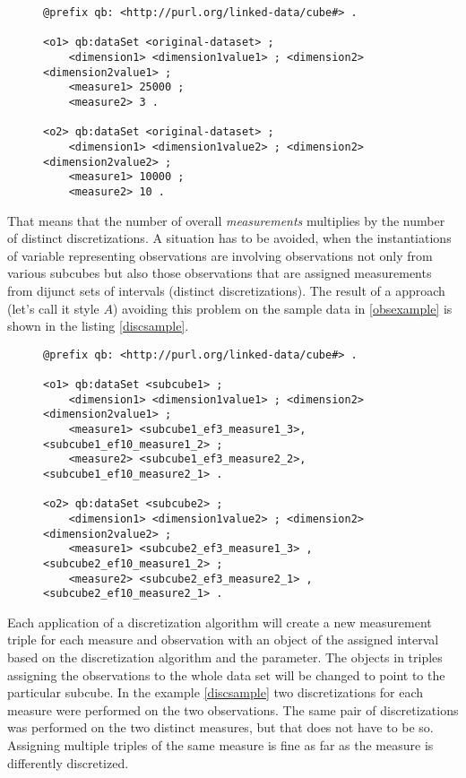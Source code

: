\begin{figure}[h]
\begin{lstlisting}[language = turtle, caption={Observations example}, label={obsexample},captionpos=b escapeinside={(*@}{@*)}]
@prefix qb: <http://purl.org/linked-data/cube#> .

<o1> qb:dataSet <original-dataset> ;
    <dimension1> <dimension1value1> ; <dimension2> <dimension2value1> ;
    <measure1> 25000 ;
    <measure2> 3 .
    
<o2> qb:dataSet <original-dataset> ;
    <dimension1> <dimension1value2> ; <dimension2> <dimension2value2> ;
    <measure1> 10000 ;
    <measure2> 10 .
\end{lstlisting}
\end{figure}

That means that the number of overall \textit{measurements} multiplies by the number of distinct discretizations. A situation has to be avoided, when the instantiations of variable representing observations are involving observations not only from various subcubes but also those observations that are assigned measurements from dijunct sets of intervals (distinct discretizations). The result of a approach (let's call it style $A$) avoiding this problem on the sample data in \ref{obsexample} is shown in the listing \ref{discsample}.

\begin{figure}[h]
\begin{lstlisting}[language = turtle, caption={Structure style A}, label={discsample},captionpos=b escapeinside={(*@}{@*)}]
@prefix qb: <http://purl.org/linked-data/cube#> .
            
<o1> qb:dataSet <subcube1> ;
    <dimension1> <dimension1value1> ; <dimension2> <dimension2value1> ;
    <measure1> <subcube1_ef3_measure1_3>, <subcube1_ef10_measure1_2> ;
    <measure2> <subcube1_ef3_measure2_2>, <subcube1_ef10_measure2_1> .
   
<o2> qb:dataSet <subcube2> ;
    <dimension1> <dimension1value2> ; <dimension2> <dimension2value2> ;
    <measure1> <subcube2_ef3_measure1_3> , <subcube2_ef10_measure1_2> ;
    <measure2> <subcube2_ef3_measure2_1> ,<subcube2_ef10_measure2_1> .
\end{lstlisting}
\end{figure}

Each application of a discretization algorithm will create a new measurement triple for each measure and observation with an object of the assigned interval based on the discretization algorithm and the parameter. The objects in triples assigning the observations to the whole data set will be changed to point to the particular subcube. In the example \ref{discsample} two discretizations for each measure were performed on the two observations. The same pair of discretizations was performed on the two distinct measures, but that does not have to be so. Assigning multiple triples of the same measure is fine as far as the measure is differently discretized.

